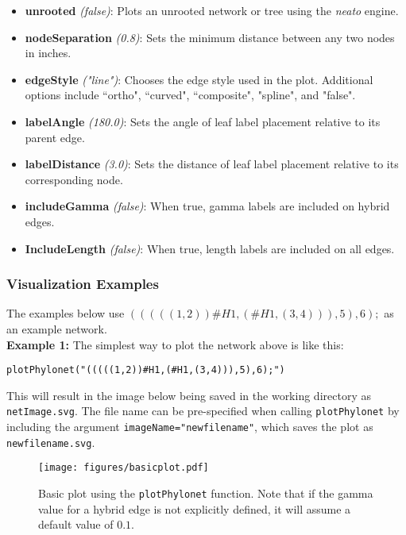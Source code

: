\documentclass[12pt]{article}
\begin{document}
\begin{itemize}
\item \textbf{unrooted} \textit{(false)}: Plots an unrooted network or tree using the \textit{neato} engine.

\item \textbf{nodeSeparation} \textit{(0.8)}: Sets the minimum distance between any two nodes in inches.

\item \textbf{edgeStyle} \textit{("line")}: Chooses the edge style used in the plot. Additional options include ``ortho", ``curved", ``composite", "spline", and "false".

\item \textbf{labelAngle} \textit{(180.0)}: Sets the angle of leaf label placement relative to its parent edge.

\item \textbf{labelDistance} \textit{(3.0)}: Sets the distance of leaf label placement relative to its corresponding node.

\item \textbf{includeGamma} \textit{(false)}: When true, gamma labels are included on hybrid edges.

\item \textbf{IncludeLength} \textit{(false)}: When true, length labels are included on all edges.

\end{itemize}


\subsubsection{Visualization Examples}

The examples below use $(((((1,2))\#H1,(\#H1,(3,4))),5),6);$ as an example network. \\

\noindent \textbf{Example 1:} The simplest way to plot the network
above is like this:
\begin{lstlisting}
plotPhylonet("(((((1,2))#H1,(#H1,(3,4))),5),6);")
\end{lstlisting}

This will result in the image below being saved in the working
directory as \texttt{netImage.svg}.  The file name can be
pre-specified when calling \texttt{plotPhylonet} by including the
argument \texttt{imageName="newfilename"}, which saves the plot as
\texttt{newfilename.svg}.

\begin{figure}[htbp]
  \begin{center}
    \texttt{[image: figures/basicplot.pdf]} \quad
    \caption{Basic plot using the \texttt{plotPhylonet} function. Note that if the gamma value for a hybrid edge is not explicitly defined, it will assume a default value of $0.1$.}
    \label{BasicPlot}
  \end{center}
\end{figure}
\end{document}
